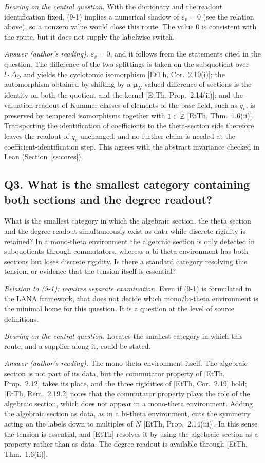 \documentclass[11pt]{article}
\theoremstyle{definition}
\begin{document}
\emph{Bearing on the central question.}  With the dictionary and the
readout identification fixed, (9-1) implies a numerical shadow of
$\varepsilon_v=0$ (see the relation above), so a nonzero value would
close this route.  The value $0$ is consistent with the route, but it
does not supply the labelwise switch.

\emph{Answer (author's reading).}  $\varepsilon_v=0$, and it follows
from the statements cited in the question.  The difference of the two
splittings is taken on the subquotient over $l\cdot\Delta_\Theta$ and
yields the cyclotomic isomorphism [EtTh, Cor.~2.19(i)]; the
automorphism obtained by shifting by a $\boldsymbol\mu_N$-valued
difference of sections is the identity on both the quotient and the
kernel [EtTh, Prop.~2.14(ii)]; and the valuation readout of Kummer
classes of elements of the base field, such as $q_v$, is preserved by
tempered isomorphisms together with $1\in\widehat{\mathbb Z}$
[EtTh, Thm.~1.6(ii)].  Transporting the identification of
coefficients to the theta-section side therefore leaves the readout
of $q_v$ unchanged, and no further claim is needed at the
coefficient-identification step.  This agrees with the abstract
invariance checked in Lean (Section~\ref{ss:cores}).

\subsection*{Q3. What is the smallest category containing both sections and the degree readout?}

What is the smallest category in which the algebraic section,
the theta section and the degree readout simultaneously exist as
data while discrete rigidity is retained?  In a mono-theta
environment the algebraic section is only detected in
subquotients through commutators, whereas a bi-theta environment
has both sections but loses discrete rigidity.  Is there a
standard category resolving this tension, or evidence that the
tension itself is essential?

\emph{Relation to (9-1): requires separate examination.}  Even if
(9-1) is formulated in the LANA framework, that does not decide
which mono/bi-theta environment is the minimal home for this
question.  It is a question at the level of source definitions.

\emph{Bearing on the central question.}  Locates the smallest
category in which this route, and a supplier along it, could be
stated.

\emph{Answer (author's reading).}  The mono-theta environment
itself.  The algebraic section is not part of its data, but the
commutator property of [EtTh, Prop.~2.12] takes its place, and the
three rigidities of [EtTh, Cor.~2.19] hold; [EtTh, Rem.~2.19.2] notes
that the commutator property plays the role of the algebraic section,
which does not appear in a mono-theta environment.  Adding the
algebraic section as data, as in a bi-theta environment, cuts the
symmetry acting on the labels down to multiples of $N$
[EtTh, Prop.~2.14(iii)].  In this sense the tension is essential, and
[EtTh] resolves it by using the algebraic section as a property rather
than as data.  The degree readout is available through
[EtTh, Thm.~1.6(ii)].
\end{document}

